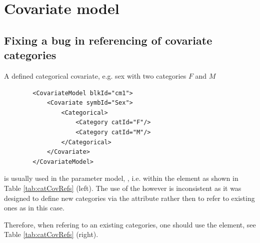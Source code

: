 \section{Covariate model}
\label{sec:covModel}

\subsection{Fixing a bug in referencing of covariate categories}
\label{subsec:fixingRefs}
A defined categorical covariate, e.g.   sex with two categories $F$ and $M$
\lstset{language=XML}
\begin{lstlisting}
        <CovariateModel blkId="cm1">
            <Covariate symbId="Sex">
                <Categorical>
                    <Category catId="F"/>
                    <Category catId="M"/>
                </Categorical>
            </Covariate>
        </CovariateModel>
\end{lstlisting}
is usually used in the parameter model, , i.e. 
within the  element as shown in Table \ref{tab:catCovRefs} (left).
The use of the  however is inconsistent as it was designed
to define new categories via the  attribute rather then to refer to 
existing ones as in this case.

Therefore, when refering to an existing categories, one should use the 
element, see Table \ref{tab:catCovRefs} (right).

